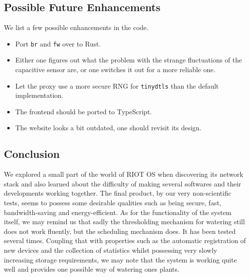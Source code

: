 \documentclass[acmtog, language=english, nonacm]{acmart}
\begin{document}
    \subsection{Possible Future Enhancements}

    We list a few possible enhancements in the code.
    \begin{itemize}
        \item Port \texttt{br} and \texttt{fw} over to Rust.
        \item Either one figures out what the problem with the strange fluctuations of the capacitive sensor are, or one switches it out for a more reliable one.
        \item Let the proxy use a more secure RNG for \texttt{tinydtls} than the default implementation.
        \item The frontend should be ported to TypeScript.
        \item The website looks a bit outdated, one should revisit its design.
    \end{itemize}

    \subsection{Conclusion}

    We explored a small part of the world of RIOT OS when discovering its network stack and also learned about the difficulty of making several softwares and their developments working together. The final product, by our very non-scientific tests, seems to possess some desirable qualities such as being secure, fast, bandwidth-saving and energy-efficient. As for the functionality of the system itself, we may remind us that sadly the thresholding mechanism for watering still does not work fluently, but the scheduling mechanism does. It has been tested several times. Coupling that with properties such as the automatic registration of new devices and the collection of statistics whilst possessing very slowly increasing storage requirements, we may note that the system is working quite well and provides one possible way of watering ones plants.

    
    

\end{document}
